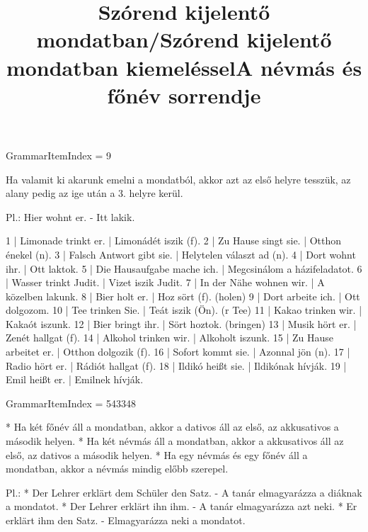\title{Szórend kijelentő mondatban/Szórend kijelentő mondatban kiemeléssel}

GrammarItemIndex = 9

\begin{desc}
Ha valamit ki akarunk emelni a mondatból, akkor azt az első helyre tesszük, az alany pedig az ige után a 3. helyre kerül.

Pl.: Hier wohnt er. - Itt lakik.
\end{desc}

\begin{exmp}
1 | Limonade trinkt er. | Limonádét iszik (f).
2 | Zu Hause singt sie. | Otthon énekel (n).
3 | Falsch Antwort gibt sie. | Helytelen választ ad (n).
4 | Dort wohnt ihr. | Ott laktok.
5 | Die Hausaufgabe mache ich. | Megcsinálom a házifeladatot.
6 | Wasser trinkt Judit. | Vizet iszik Judit.
7 | In der Nähe wohnen wir. | A közelben lakunk.
8 | Bier holt er. | Hoz sört (f). (holen)
9 | Dort arbeite ich. | Ott dolgozom.
10 | Tee trinken Sie. | Teát iszik (Ön). (r Tee)
11 | Kakao trinken wir. | Kakaót iszunk.
12 | Bier bringt ihr. | Sört hoztok. (bringen)
13 | Musik hört er. | Zenét hallgat (f).
14 | Alkohol trinken wir. | Alkoholt iszunk.
15 | Zu Hause arbeitet er. | Otthon dolgozik (f).
16 | Sofort kommt sie. | Azonnal jön (n).
17 | Radio hört er. | Rádiót hallgat (f).
18 | Ildikó heißt sie. | Ildikónak hívják.
19 | Emil heißt er. | Emilnek hívják.
\end{exmp}

\title{A névmás és főnév sorrendje}

GrammarItemIndex = 543348

\begin{desc}
* Ha két főnév áll a mondatban, akkor a dativos áll az első, az akkusativos a második helyen.
* Ha két névmás áll a mondatban, akkor a akkusativos áll az első, az dativos a második helyen.
* Ha egy névmás és egy főnév áll a mondatban, akkor a névmás mindig előbb szerepel.

Pl.: * Der Lehrer erklärt dem Schüler den Satz. - A tanár elmagyarázza a diáknak a mondatot.
* Der Lehrer erklärt ihn ihm. - A tanár elmagyarázza azt neki.
* Er erklärt ihm den Satz. - Elmagyarázza neki a mondatot.
\end{desc}

